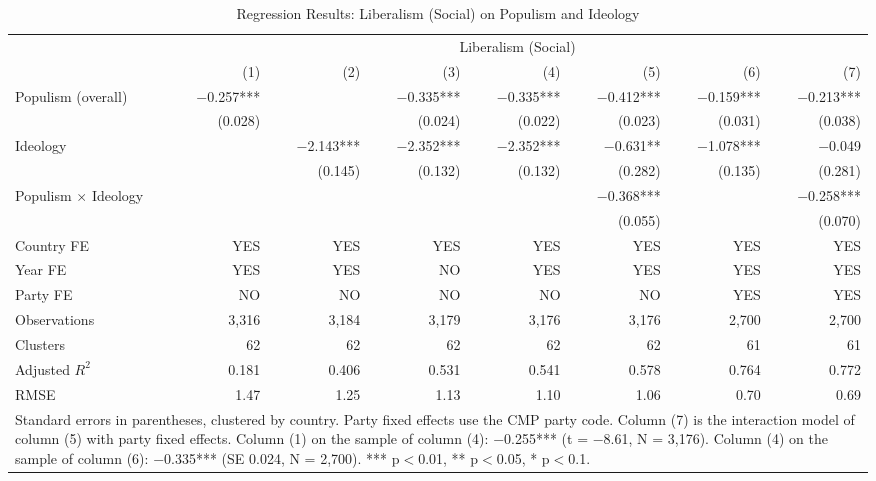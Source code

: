 \begin{table}
\caption{Regression Results: Liberalism (Social) on Populism and Ideology}
\label{tab:6}
\scriptsize\setlength{\tabcolsep}{4pt}
\centering
\begin{tabular}{lrrrrrrr}
\toprule
 & \multicolumn{7}{c}{Liberalism (Social)} \\
 & (1) & (2) & (3) & (4) & (5) & (6) & (7) \\
 \midrule
Populism (overall) & $-$0.257*** &  & $-$0.335*** & $-$0.335*** & $-$0.412*** & $-$0.159*** & $-$0.213*** \\
& (0.028) &  & (0.024) & (0.022) & (0.023) & (0.031) & (0.038) \\
Ideology &  & $-$2.143*** & $-$2.352*** & $-$2.352*** & $-$0.631** & $-$1.078*** & $-$0.049 \\
&  & (0.145) & (0.132) & (0.132) & (0.282) & (0.135) & (0.281) \\
Populism $\times$ Ideology &  &  &  &  & $-$0.368*** &  & $-$0.258*** \\
&  &  &  &  & (0.055) &  & (0.070) \\
\midrule
Country FE & YES & YES & YES & YES & YES & YES & YES\\
Year FE & YES & YES & NO & YES & YES & YES & YES\\
Party FE & NO & NO & NO & NO & NO & YES & YES\\
Observations & 3,316 & 3,184 & 3,179 & 3,176 & 3,176 & 2,700 & 2,700 \\
Clusters & 62 & 62 & 62 & 62 & 62 & 61 & 61 \\
Adjusted $R^2$ & 0.181 & 0.406 & 0.531 & 0.541 & 0.578 & 0.764 & 0.772 \\
RMSE & 1.47 & 1.25 & 1.13 & 1.10 & 1.06 & 0.70 & 0.69 \\
\bottomrule
\multicolumn{8}{p{0.9\linewidth}}{\scriptsize Standard errors in parentheses, clustered by country. Party fixed effects use the CMP party code. Column (7) is the interaction model of column (5) with party fixed effects. Column (1) on the sample of column (4): $-$0.255*** (t = $-$8.61, N = 3,176). Column (4) on the sample of column (6): $-$0.335*** (SE 0.024, N = 2,700). *** p$<$0.01, ** p$<$0.05, * p$<$0.1.} \\
\end{tabular}
\end{table}

